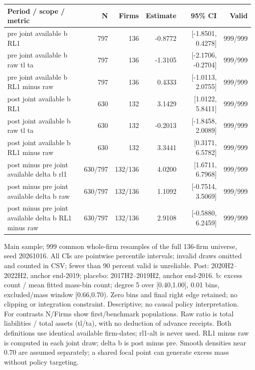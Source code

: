 \begingroup\scriptsize\setlength{\tabcolsep}{3pt}
\begin{threeparttable}
\begin{tabular}{p{6.0cm}rrrrr}
\toprule
Period / scope / metric & N & Firms & Estimate & 95\% CI & Valid \\
\midrule
pre joint available b RL1 & 797 & 136 & -0.8772 & [-1.8501, 0.4278] & 999/999 \\
pre joint available b raw tl ta & 797 & 136 & -1.3105 & [-2.1706, -0.2704] & 999/999 \\
pre joint available b RL1 minus raw & 797 & 136 & 0.4333 & [-1.0113, 2.0755] & 999/999 \\
post joint available b RL1 & 630 & 132 & 3.1429 & [1.0122, 5.8411] & 999/999 \\
post joint available b raw tl ta & 630 & 132 & -0.2013 & [-1.8458, 2.0089] & 999/999 \\
post joint available b RL1 minus raw & 630 & 132 & 3.3441 & [0.3171, 6.5782] & 999/999 \\
post minus pre joint available delta b rl1 & 630/797 & 132/136 & 4.0200 & [1.6711, 6.7968] & 999/999 \\
post minus pre joint available delta b raw & 630/797 & 132/136 & 1.1092 & [-0.7514, 3.5069] & 999/999 \\
post minus pre joint available delta b RL1 minus raw & 630/797 & 132/136 & 2.9108 & [-0.5880, 6.2459] & 999/999 \\
\bottomrule
\end{tabular}
\begin{tablenotes}[flushleft]\footnotesize
\item[] Main sample; 999 common whole-firm resamples of the full 136-firm universe, seed 20261016. All CIs are pointwise percentile intervals; invalid draws omitted and counted in CSV; fewer than 90 percent valid is unreliable. Post: 2020H2--2022H2, anchor end-2019; placebo: 2017H2--2019H2, anchor end-2016. b: excess count / mean fitted mass-bin count; degree 5 over [0.40,1.00], 0.01 bins, excluded/mass window [0.66,0.70). Zero bins and final right edge retained; no clipping or integration constraint. Descriptive; no causal policy interpretation. For contrasts N/Firms show first/benchmark populations. Raw ratio is total liabilities / total assets (tl/ta), with no deduction of advance receipts. Both definitions use identical available firm-dates; rl1-alt is never used. RL1 minus raw is computed in each joint draw; delta b is post minus pre. Smooth densities near 0.70 are assumed separately; a shared focal point can generate excess mass without policy targeting.
\end{tablenotes}
\end{threeparttable}
\endgroup
\par\medskip
